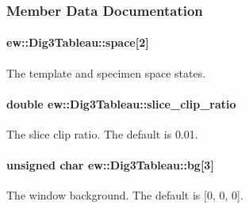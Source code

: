 \subsubsection{Member Data Documentation}
\hypertarget{classew_1_1Dig3Tableau_a1b990b9b496c362b4163a524495991e8}{
\paragraph[{space}]{ {\bf ew::Dig3Tableau::space}\mbox{[}2\mbox{]}}\hfill}
\label{classew_1_1Dig3Tableau_a1b990b9b496c362b4163a524495991e8}
The template and specimen space states. \hypertarget{classew_1_1Dig3Tableau_abf30abc4fcb077a98b911b66136ed29e}{
\paragraph[{slice\_\-clip\_\-ratio}]{\setlength{\rightskip}{0pt plus 5cm}double {\bf ew::Dig3Tableau::slice\_\-clip\_\-ratio}}\hfill}
\label{classew_1_1Dig3Tableau_abf30abc4fcb077a98b911b66136ed29e}
The slice clip ratio. The default is 0.01. \hypertarget{classew_1_1Dig3Tableau_ade125d58d73182b82eecad5ff22f7008}{
\paragraph[{bg}]{\setlength{\rightskip}{0pt plus 5cm}unsigned char {\bf ew::Dig3Tableau::bg}\mbox{[}3\mbox{]}}\hfill}
\label{classew_1_1Dig3Tableau_ade125d58d73182b82eecad5ff22f7008}
The window background. The default is \mbox{[}0, 0, 0\mbox{]}. 